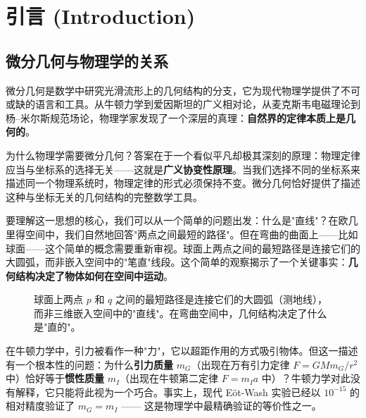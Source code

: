\chapter{引言 (Introduction)}

\section{微分几何与物理学的关系}

微分几何是数学中研究光滑流形上的几何结构的分支，它为现代物理学提供了不可或缺的语言和工具。从牛顿力学到爱因斯坦的广义相对论，从麦克斯韦电磁理论到杨--米尔斯规范场论，物理学家发现了一个深层的真理：\textbf{自然界的定律本质上是几何的}。

\begin{note}[物理动机]
为什么物理学需要微分几何？答案在于一个看似平凡却极其深刻的原理：物理定律应当与坐标系的选择无关——这就是\textbf{广义协变性原理}。当我们选择不同的坐标系来描述同一个物理系统时，物理定律的形式必须保持不变。微分几何恰好提供了描述这种与坐标无关的几何结构的完整数学工具。
\end{note}

要理解这一思想的核心，我们可以从一个简单的问题出发：什么是"直线"？在欧几里得空间中，我们自然地回答"两点之间最短的路径"。但在弯曲的曲面上——比如球面——这个简单的概念需要重新审视。球面上两点之间的最短路径是连接它们的大圆弧，而非嵌入空间中的"笔直"线段。这个简单的观察揭示了一个关键事实：\textbf{几何结构决定了物体如何在空间中运动}。

\begin{figure}[htbp]
\centering
{}
\caption{球面上两点 $p$ 和 $q$ 之间的最短路径是连接它们的大圆弧（测地线），而非三维嵌入空间中的"直线"。在弯曲空间中，几何结构决定了什么是"直的"。}
\label{fig:sphere_geodesic}
\end{figure}

在牛顿力学中，引力被看作一种"力"，它以超距作用的方式吸引物体。但这一描述有一个根本性的问题：为什么\textbf{引力质量} $m_G$（出现在万有引力定律 $F = G M m_G / r^2$ 中）恰好等于\textbf{惯性质量} $m_I$（出现在牛顿第二定律 $F = m_I a$ 中）？牛顿力学对此没有解释，它只能将此视为一个巧合。事实上，现代 E\"ot-Wash 实验已经以 $10^{-15}$ 的相对精度验证了 $m_G = m_I$ —— 这是物理学中最精确验证的等价性之一。

